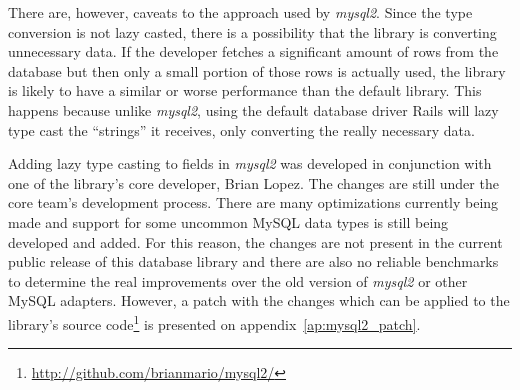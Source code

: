 There are, however, caveats to the approach used by \textit{mysql2}. Since the type conversion is not lazy casted, there is a possibility that the library is converting unnecessary data. If the developer fetches a significant amount of rows from the database but then only a small portion of those rows is actually used, the library is likely to have a similar or worse performance than the default library. This happens because unlike \textit{mysql2}, using the default database driver Rails will lazy type cast the ``strings'' it receives, only converting the really necessary data.

Adding lazy type casting to fields in \textit{mysql2} was developed in conjunction with one of the library's core developer, Brian Lopez. The changes are still under the core team's development process. There are many optimizations currently being made and support for some uncommon MySQL data types is still being developed and added. For this reason, the changes are not present in the current public release of this database library and there are also no reliable benchmarks to determine the real improvements over the old version of \textit{mysql2} or other MySQL adapters. However, a patch with the changes which can be applied to the library's source code\footnote{\url{http://github.com/brianmario/mysql2/}} is presented on appendix~\ref{ap:mysql2_patch}.

